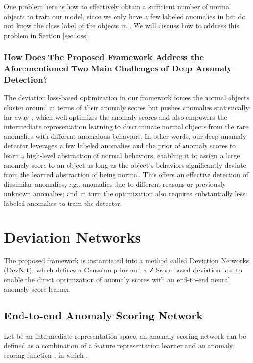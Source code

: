 \documentclass[sigconf]{acmart}
\begin{document}
One problem here is how to effectively obtain a sufficient number of normal objects to train our model, since we only have a few labeled anomalies in  but do not know the class label of the objects in . We will discuss how to address this problem in Section \ref{sec:loss}.

\subsubsection{How Does The Proposed Framework Address the Aforementioned Two Main Challenges of Deep Anomaly Detection?}

The deviation loss-based optimization in our framework forces the normal objects cluster around  in terms of their anomaly scores but pushes anomalies statistically far away , which well optimizes the anomaly scores and also empowers the intermediate representation learning to discriminate normal objects from the rare anomalies with different anomalous behaviors. In other words, our deep anomaly detector leverages a few labeled anomalies and the prior of anomaly scores to learn a high-level abstraction of normal behaviors, enabling it to assign a large anomaly score to an object as long as the object's behaviors significantly deviate from the learned abstraction of being normal. This offers an effective detection of dissimilar anomalies, e.g., anomalies due to different reasons or previously unknown anomalies; and in turn the optimization also requires substantially less labeled anomalies to train the detector.



\section{Deviation Networks}

The proposed framework is instantiated into a method called Deviation Networks (DevNet), which defines a Gaussian prior and a Z-Score-based deviation loss to enable the direct optimization of anomaly scores with an end-to-end neural anomaly score learner.

\subsection{End-to-end Anomaly Scoring Network}
Let  be an intermediate representation space, an anomaly scoring network  can be defined as a combination of a feature representation learner  and an anomaly scoring function , in which . 
\end{document}
